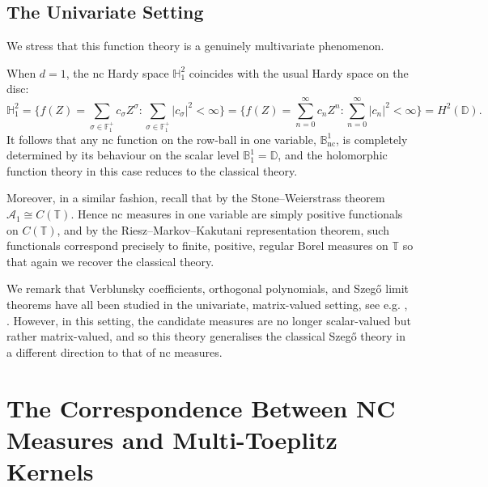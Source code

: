 \documentclass[11pt,reqno]{amsart}
\def\s{\sigma}
\def\DD{\mathbb{D}}
\def\BB{\mathbb{B}}
\def\TT{\mathbb{T}}
\def\FF{\mathbb{F}}
\def\HH{\mathbb{H}}
\def\nc{\mathrm{nc}}
\def\scrA{\mathscr{A}}
\theoremstyle{definition}
\numberwithin{equation}{section}
\begin{document}
\subsection{The Univariate Setting}

We stress that this function theory is a genuinely multivariate phenomenon.

When \(d = 1\), the nc Hardy space \(\HH^2_1\) coincides with the usual Hardy space on the disc:
\[
    \HH^2_1 = \{ f(Z) = \sum_{\s \in \FF_1^+} c_\s Z^\s : \sum_{\s \in \FF_1^+} \lvert c_\s \rvert^2 < \infty \} = \{ f(Z) = \sum_{n=0}^{\infty} c_n Z^n : \sum_{n=0}^{\infty} \lvert c_n \rvert^2 < \infty \} = H^2(\DD).
\]
It follows that any nc function on the row-ball in one variable, \(\BB^1_\nc\), is completely determined by its behaviour on the scalar level \(\BB^1_1 = \DD\), and the holomorphic function theory in this case reduces to the classical theory.

Moreover, in a similar fashion, recall that by the Stone--Weierstrass theorem \(\scrA_1 \cong C(\TT)\). Hence nc measures in one variable are simply positive functionals on \(C(\TT)\), and by the Riesz--Markov--Kakutani representation theorem, such functionals correspond precisely to finite, positive, regular Borel measures on \(\TT\) so that again we recover the classical theory.

We remark that Verblunsky coefficients, orthogonal polynomials, and Szeg\H{o} limit theorems have all been studied in the univariate, matrix-valued setting, see e.g. \cite{DPS08}, \cite{DK16}. However, in this setting, the candidate measures are no longer scalar-valued but rather matrix-valued, and so this theory generalises the classical Szeg\H{o} theory in a different direction to that of nc measures.

\section{The Correspondence Between NC Measures and Multi-Toeplitz Kernels}
\end{document}
